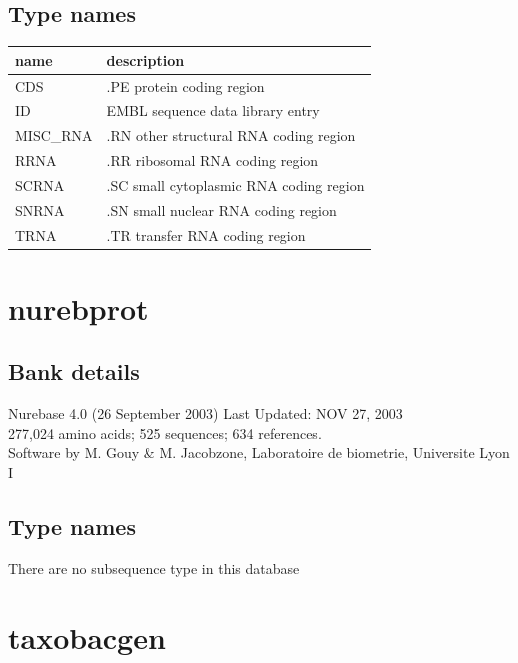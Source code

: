 \documentclass{article}
\begin{document}
\begin{Schunk}
\subsection{Type names}
\noindent\begin{tabular}{ll}
\hline \hline
name & description\\
\hline
CDS & .PE protein coding region \\
ID & EMBL sequence data library entry \\
MISC\_RNA & .RN other structural RNA coding region \\
RRNA & .RR ribosomal RNA coding region \\
SCRNA & .SC small cytoplasmic RNA coding region \\
SNRNA & .SN small nuclear RNA coding region \\
TRNA & .TR transfer RNA coding region \\
\hline \hline
\end{tabular}

\section{ nurebprot }
\subsection{Bank details}
Nurebase 4.0 (26 September 2003) Last Updated: NOV 27, 2003\\
277,024 amino acids; 525 sequences; 634 references.\\
Software by M. Gouy \& M. Jacobzone, Laboratoire de biometrie, Universite Lyon I

\subsection{Type names}
There are no subsequence type in this database
\section{ taxobacgen }

\end{Schunk}
\end{document}
